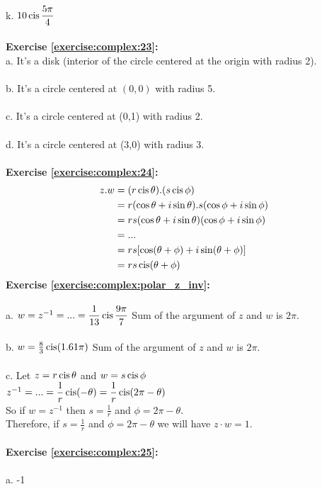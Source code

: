 \\
k. $10\operatorname{cis}\displaystyle\frac{5\pi}{4}$\\
\\
\textbf{Exercise \ref{exercise:complex:23}:}\\
a. It's a disk (interior of the circle centered at the origin with radius 2).\\
\\
b. It's a circle centered at $(0,0)$ with radius 5.\\
\\
c. It's a circle centered at (0,1) with radius 2.\\
\\
d. It's a circle centered at (3,0) with radius 3.\\
\\
\textbf{Exercise \ref{exercise:complex:24}:}
\begin{align*}
z.w & = (r\operatorname{cis}\theta).(s\operatorname{cis}\phi)\\
&= r(\cos\theta+i\sin\theta).s(\cos\phi+i\sin\phi)\\
&= rs(\cos\theta+i\sin\theta)(\cos\phi+i\sin\phi)\\
&= ...\\
&= rs[\cos(\theta+\phi)+i\sin(\theta+\phi)]\\
&= rs\operatorname{cis}(\theta+\phi)
\end{align*}
\textbf{Exercise \ref{exercise:complex:polar_z_inv}:}\\
\\
a. $w=z^{-1}=...=\displaystyle\frac{1}{13}\operatorname{cis}\frac{9\pi}{7}$
Sum of the argument of $z$ and $w$ is $2\pi$.\\
\\
b. $w=\frac{8}{3}\operatorname{cis}(1.61\pi)$ 
Sum of the argument of $z$ and $w$ is $2\pi$.\\
\\
c. Let $z=r\operatorname{cis}\theta$ and $w=s\operatorname{cis}\phi$\\
$z^{-1}=...=\displaystyle\frac{1}{r}\operatorname{cis}(-\theta)=\frac{1}{r}\operatorname{cis}(2\pi-\theta)$\\
So if $w=z^{-1}$ then $s=\displaystyle\frac{1}{r}$ and $\phi=2\pi-\theta$.\\
Therefore, if $s=\displaystyle\frac{1}{r}$ and $\phi=2\pi-\theta$ we will have $z\cdot w=1$.\\
\\
\textbf{Exercise \ref{exercise:complex:25}:}\\
\\
a. -1\\
\\
